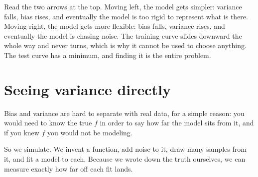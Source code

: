 \documentclass[
  a4paper,
]{scrbook}
\begin{document}
Read the two arrows at the top. Moving left, the model gets simpler:
variance falls, bias rises, and eventually the model is too rigid to
represent what is there. Moving right, the model gets more flexible:
bias falls, variance rises, and eventually the model is chasing noise.
The training curve slides downward the whole way and never turns, which
is why it cannot be used to choose anything. The test curve has a
minimum, and finding it is the entire problem.

\section{Seeing variance directly}\label{seeing-variance-directly}

Bias and variance are hard to separate with real data, for a simple
reason: you would need to know the true \(f\) in order to say how far
the model sits from it, and if you knew \(f\) you would not be modeling.

So we simulate. We invent a function, add noise to it, draw many samples
from it, and fit a model to each. Because we wrote down the truth
ourselves, we can measure exactly how far off each fit lands.
\end{document}
